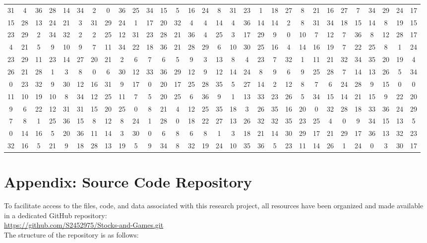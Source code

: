 \documentclass[11pt,twoside]{article}
\numberwithin{Theorem}{section}
\numberwithin{Definition}{section}
\numberwithin{Lemma}{section}
\numberwithin{Algorithm}{section}
\numberwithin{equation}{section}
\begin{document}
\begin{table}
\begin{tabular}{|*{30}{c|}}
31 &4 &36 &28 &14 &34 &2 &0 &36 &25 &34 &15 &5 &16 &24&8 &31 &23 &1 &18 &27 &8 &21 &16 &27 &7 &34 &29 &24 &17\\
15 &28 &13 &24 &21 &3 &31 &29 &24 &1 &17 &20 &32 &4 &4&14 &4 &36 &14 &14 &2 &8 &31 &34 &18 &15 &14 &8 &19 &15\\
23 &29 &2 &34 &32 &2 &2 &25 &12 &31 &23 &28 &21 &36 &4&25 &3 &17 &29 &9 &0 &10 &7 &12 &7 &36 &8 &12 &28 &17\\
4 &21 &5 &9 &10 &9 &7 &11 &34 &22 &18 &36 &21 &28 &29&6 &10 &30 &25 &16 &4 &14 &16 &19 &7 &22 &25 &8 &1 &24\\
23 &29 &11 &23 &14 &27 &20 &21 &2 &6 &7 &6 &5 &9 &3&13 &8 &4 &23 &7 &32 &1 &11 &21 &32 &34 &35 &20 &19 &4\\
26 &21 &28 &1 &3 &8 &0 &6 &30 &12 &33 &36 &29 &12 &9&12 &14 &24 &8 &9 &6 &9 &25 &28 &7 &14 &13 &26 &5 &34\\
0 &23 &32 &9 &30 &12 &16 &31 &9 &17 &0 &20 &17 &25 &28&35 &5 &27 &14 &2 &12 &8 &7 &6 &24 &28 &9 &15 &0 &0\\
11 &10 &19 &10 &8 &34 &12 &25 &11 &7 &5 &20 &25 &6 &36&9 &1 &13 &33 &23 &26 &5 &34 &15 &14 &21 &15 &9 &22 &20\\
9 &6 &22 &12 &31 &31 &15 &20 &25 &0 &8 &21 &4 &12 &25&35 &18 &3 &26 &35 &16 &20 &0 &32 &28 &18 &33 &36 &24 &29\\
7 &8 &1 &25 &36 &15 &8 &12 &8 &24 &1 &28 &0 &18 &22&27 &13 &26 &32 &32 &35 &23 &25 &4 &0 &9 &34 &15 &13 &5\\
0 &14 &16 &5 &20 &36 &11 &14 &3 &30 &0 &6 &8 &6 &8&1 &3 &18 &21 &14 &30 &29 &17 &21 &29 &17 &36 &13 &32 &23\\
32 &16 &5 &21 &9 &18 &28 &13 &19 &5 &9 &34 &8 &32 &19&24 &10 &35 &36 &5 &23 &11 &14 &26 &1 &24 &0 &3 &30 &17\\
 \hline
  \end{tabular}
\end{table}
\clearpage
\section{Appendix: Source Code Repository}

To facilitate access to the files, code, and data associated with this research project, all resources have been organized and made available in a dedicated GitHub repository:\\

\url{https://github.com/S2452975/Stocks-and-Games.git}\\

The structure of the repository is as follows:\\
\end{document}
